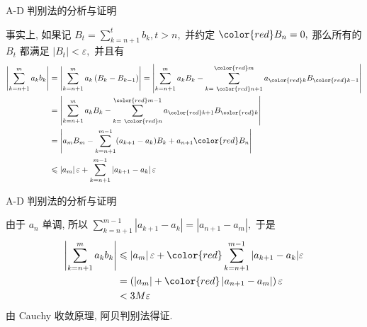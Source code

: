 
\begin{frame}{A-D 判别法的分析与证明}

事实上, 如果记 $B_t = \sum\limits_{k=n+1}^{t} b_k, t > n,$ 并约定 ${\color{red}B_n = 0},$ 那么所有的 $B_t$ 都满足 $\lvert B_t \rvert < \varepsilon,$ 并且有
\begin{align*}
\left\lvert \sum\limits_{k=n+1}^{m} a_k b_k \right\rvert & = \left\lvert \sum\limits_{k=n+1}^{m} a_k \left( B_{k} - B_{k-1} \right) \right\rvert = \left\lvert \sum\limits_{k=n+1}^{m} a_k B_{k} - \sum\limits_{k = ~ {\color{red}n+1}}^{{\color{red}m}} a_{{\color{red}k}} B_{{\color{red}k-1}} \right\rvert \\
& = \left\lvert \sum\limits_{k=n+1}^{m} a_k B_{k} - \sum\limits_{k = ~ {\color{red}n}}^{{\color{red}m-1}} a_{{\color{red}k+1}} B_{{\color{red}k}} \right\rvert \\
& = \left\lvert a_mB_m - \sum\limits_{k=n+1}^{m-1} (a_{k+1} - a_k) B_{k} + a_{n+1}{\color{red}B_n} \right\rvert \\
& \leqslant \left\lvert a_m \right\rvert \varepsilon + \sum\limits_{k=n+1}^{m-1} \left\lvert a_{k+1} - a_k \right\rvert \varepsilon
\end{align*}

\end{frame}


\begin{frame}{A-D 判别法的分析与证明}

由于 $a_n$ 单调, 所以 $\sum\limits_{k=n+1}^{m-1} \left\lvert a_{k+1} - a_k \right\rvert = \left\lvert a_{n+1} - a_{m} \right\rvert,$ 于是
\begin{align*}
\left\lvert \sum\limits_{k=n+1}^{m} a_k b_k \right\rvert & \leqslant \left\lvert a_m \right\rvert \varepsilon + {\color{red} \sum\limits_{k=n+1}^{m-1} \left\lvert a_{k+1} - a_k \right\rvert} \varepsilon \\
& = \left( \left\lvert a_m \right\rvert + {\color{red} \left\lvert a_{n+1} - a_{m} \right\rvert} \right) \varepsilon \\
& < 3M\varepsilon
\end{align*}
\pause
由 Cauchy 收敛原理, 阿贝判别法得证.

\end{frame}


